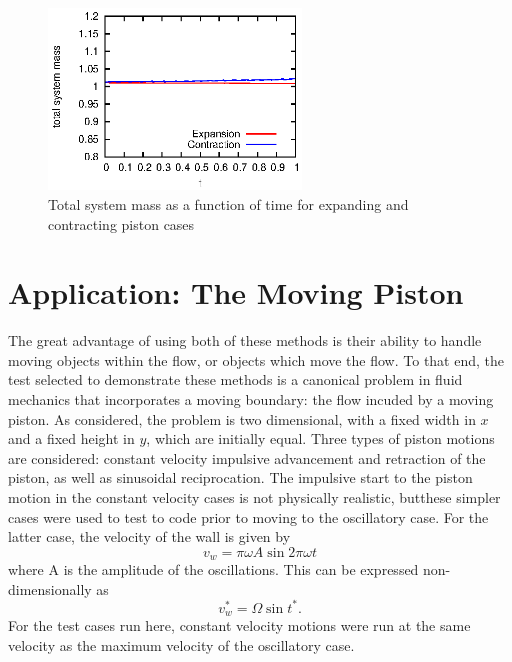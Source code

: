 \documentclass{article}
\begin{document}
\begin{figure}
    \centering
    \includegraphics[width=0.6\textwidth]{plot-cons-ib.eps}         
    \caption{Total system mass as a function of time for expanding and contracting piston cases}
    \label{fig:plot-cons-ib}
  \end{figure}



\section{Application: The Moving Piston}

The great advantage of using both of these methods is their ability to handle moving objects within the flow, or objects which move the flow.  To that end, the test selected to demonstrate these methods is a canonical problem in fluid mechanics that incorporates a moving boundary: the flow incuded by a moving piston.  As considered, the problem is two dimensional, with a fixed width in $x$ and a fixed height in $y$, which are initially equal.  Three types of piston motions are considered: constant velocity impulsive advancement and retraction of the piston, as well as sinusoidal reciprocation. The impulsive start to the piston motion in the constant velocity cases is not physically realistic, butthese simpler cases were used to test to code prior to moving to the oscillatory case. For the latter case, the velocity of the wall is given by 
\begin{equation}
  v_w = \pi \omega A \sin{2 \pi \omega t}
\end{equation}
where A is the amplitude of the oscillations. This can be expressed non-dimensionally as 
\begin{equation}
  v_w^* = \Omega \sin{t^*}.
\end{equation}
For the test cases run here, constant velocity motions were run at the same velocity as the maximum velocity of the oscillatory case.
\end{document}
